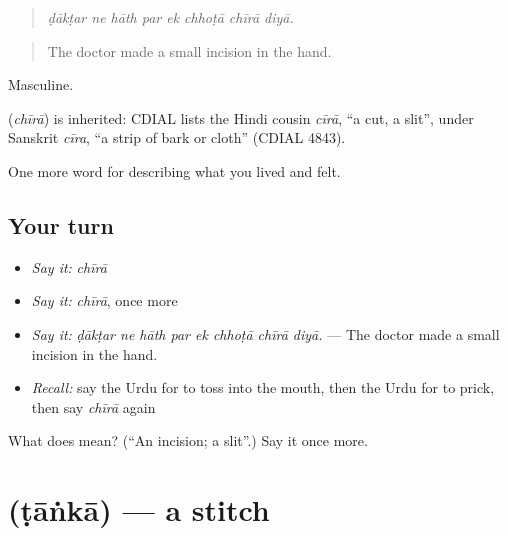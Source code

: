 \begin{quote}
       
\end{quote}

\begin{quote}
\emph{ḍākṭar ne hāth par ek chhoṭā chīrā diyā.}
\end{quote}

\begin{quote}
The doctor made a small incision in the hand.
\end{quote}

Masculine.

\begin{cousinweb}
\textbf{} (\emph{chīrā}) is inherited: CDIAL lists the Hindi cousin \emph{cīrā}, \textquotedblleft{}a cut, a slit\textquotedblright{}, under Sanskrit \emph{cīra}, \textquotedblleft{}a strip of bark or cloth\textquotedblright{} (CDIAL 4843).
\end{cousinweb}

\begin{grammarlens}[title={What you've built}]
One more word for describing what you lived and felt.
\end{grammarlens}

\subsection*{Your turn}
\begin{itemize}
\raggedright
  \item \emph{Say it:} \emph{chīrā}
  \item \emph{Say it:} \emph{chīrā}, once more
  \item \emph{Say it:} \emph{ḍākṭar ne hāth par ek chhoṭā chīrā diyā.} — The doctor made a small incision in the hand.
  \item \emph{Recall:} say the Urdu for to toss into the mouth, then the Urdu for to prick, then say \emph{chīrā} again
\end{itemize}

\begin{tcolorbox}[breakable,colback=teal!4,colframe=teal!35!black,title={Before you move on}]
What does  mean? (\textquotedblleft{}An incision; a slit\textquotedblright{}.) Say it once more.
\end{tcolorbox}
\section[\texorpdfstring{\ur{ٹانکا} (ṭāṅkā)}{ٹانکا (ṭāṅkā)}]{ (ṭāṅkā) — a stitch}

